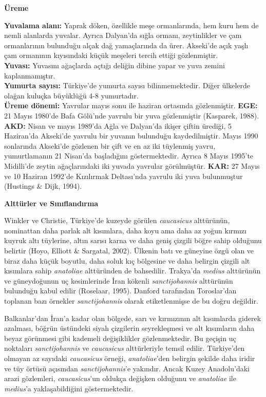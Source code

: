 \documentclass[
  10.5pt,
  a4paper,
  DIV=11,
  numbers=noendperiod,
  twocolumn]{scrreprt}
\begin{document}
\textbf{Üreme}

\textbf{Yuvalama alanı:} Yaprak döken, özellikle meşe ormanlarında, hem
kuru hem de nemli alanlarda yuvalar. Ayrıca Dalyan'da sığla ormanı,
zeytinlikler ve çam ormanlarının bulunduğu alçak dağ yamaçlarında da
ürer. Akseki'de açık yaşlı çam ormanının kıyısındaki küçük meşeleri
tercih ettiği gözlenmiştir.\\
\textbf{Yuvası:} Yuvasını ağaçlarda açtığı deliğin dibine yapar ve yuva
zemini kaplanmamıştır.\\
\textbf{Yumurta sayısı:} Türkiye'de yumurta sayısı bilinmemektedir.
Diğer ülkelerde olağan kuluçka büyüklüğü 4-8 yumurtadır.\\
\textbf{Üreme dönemi:} Yavrular mayıs sonu ile haziran ortasında
gözlenmiştir. \textbf{EGE:} 21 Mayıs 1980'de Bafa Gölü'nde yavrulu bir
yuva gözlenmiştir (Kasparek, 1988). \textbf{AKD:} Nisan ve mayıs 1989'da
Ağla ve Dalyan'da ikişer çiftin ürediği, 5 Haziran'da Akseki'de yavrulu
bir yuvanın bulunduğu kaydedilmiştir. Mayıs 1990 sonlarında Akseki'de
gözlenen bir çift ve en az iki tüylenmiş yavru, yumurtlamanın 21
Nisan'da başladığını göstermektedir. Ayrıca 8 Mayıs 1995'te Midilli'de
zeytin ağaçlarındaki iki yuvada yavrular görülmüştür. \textbf{KAR:} 27
Mayıs ve 10 Haziran 1992'de Kızılırmak Deltası'nda yavrulu iki yuva
bulunmuştur (Hustings \& Dijk, 1994).

\textbf{Alttürler ve Sınıflandırma}

Winkler ve Christie, Türkiye'de kuzeyde görülen \emph{caucasicus}
alttürünün, nominattan daha parlak alt kısımlara, daha koyu ama daha az
yoğun kırmızı kuyruk altı tüylerine, altın sarısı karna ve daha geniş
çizgili böğre sahip olduğunu belirtir (Hoyo, Elliott \& Sargatal, 2002).
Ülkenin batı ve güneyine özgü olan ve biraz daha küçük boyutlu, daha
soluk kıç bölgesine ve daha belirgin çizgili alt kısımlara sahip
\emph{anatoliae} alttüründen de bahsedilir. Trakya'da \emph{medius}
alttürünün ve güneydoğunun uç kesimlerinde İran kökenli
\emph{sanctijohannis} alttürünün bulunduğu kabul edilir (Roselaar,
1995). Danford tarafından Toroslar'dan toplanan bazı örnekler
\emph{sanctijohannis} olarak etiketlenmişse de bu doğru değildir.

Balkanlar'dan İran'a kadar olan bölgede, sarı ve kırmızının alt
kısımlarda giderek azalması, böğrün üstündeki siyah çizgilerin
seyrekleşmesi ve alt kısımların daha beyaz görünmesi gibi kademeli
değişiklikler gözlenmektedir. Bu geçişin uç noktaları
\emph{sanctijohannis} ve \emph{caucasicus} alttürleriyle temsil edilir.
Türkiye'den olmayan az sayıdaki \emph{caucasicus} örneği,
\emph{anatoliae}'den belirgin şekilde daha iridir ve tüy örtüsü
açısından \emph{sanctijohannis}'e yakındır. Ancak Kuzey Anadolu'daki
arazi gözlemleri, \emph{caucasicus}'un oldukça değişken olduğunu ve
\emph{anatoliae} ile \emph{medius}'a yaklaşabildiğini göstermektedir.
\end{document}
